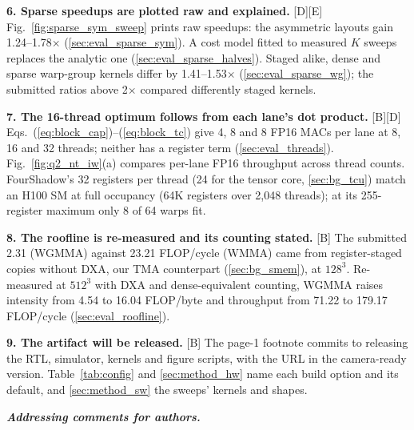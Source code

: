 \vspace{1pt}
\noindent\textbf{6. Sparse speedups are plotted raw and explained.} [D][E]
Fig.~\ref{fig:sparse_sym_sweep} prints raw speedups: the asymmetric layouts gain
1.24--1.78$\times$ (\ref{sec:eval_sparse_sym}). A cost model fitted to measured $K$ sweeps
replaces the analytic one (\ref{sec:eval_sparse_halves}). Staged alike, dense and sparse
warp-group kernels differ by 1.41--1.53$\times$ (\ref{sec:eval_sparse_wg}); the submitted ratios
above 2$\times$ compared differently staged kernels.

\vspace{1pt}
\noindent\textbf{7. The 16-thread optimum follows from each lane's dot product.} [B][D]
Eqs.~(\ref{eq:block_cap})--(\ref{eq:block_tc}) give 4, 8 and 8 FP16 MACs per lane at 8, 16 and
32 threads; neither has a register term (\ref{sec:eval_threads}). Fig.~\ref{fig:q2_nt_iw}(a)
compares per-lane FP16 throughput across thread counts. FourShadow's 32 registers per thread (24
for the tensor core, \ref{sec:bg_tcu}) match an H100 SM at full occupancy (64K registers over
2,048 threads); at its 255-register maximum only 8 of 64 warps fit.

\vspace{1pt}
\noindent\textbf{8. The roofline is re-measured and its counting stated.} [B] The submitted 2.31
(WGMMA) against 23.21 FLOP/cycle (WMMA) came from register-staged copies without DXA, our TMA
counterpart (\ref{sec:bg_smem}), at $128^3$. Re-measured at $512^3$ with DXA and dense-equivalent
counting, WGMMA raises intensity from 4.54 to 16.04 FLOP/byte and throughput from 71.22 to 179.17
FLOP/cycle (\ref{sec:eval_roofline}).

\vspace{1pt}
\noindent\textbf{9. The artifact will be released.} [B] The page-1 footnote commits to releasing
the RTL, simulator, kernels and figure scripts, with the URL in the camera-ready version.
Table~\ref{tab:config} and \ref{sec:method_hw} name each build option and its default, and
\ref{sec:method_sw} the sweeps' kernels and shapes.

\vspace{3pt}
\noindent\textbf{\emph{Addressing comments for authors.}}

